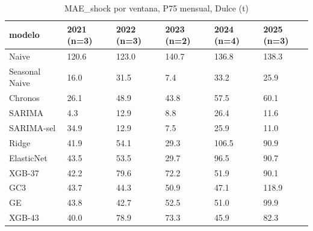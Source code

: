 \begin{table}[H]
\centering
\small
\caption{MAE\_shock por ventana, P75 mensual, Dulce (t)}
\label{tab:T05_MAE_shock_P75_por_ventana_dulce}
\begin{tabular}{llllll}
\toprule
modelo & 2021 (n=3) & 2022 (n=3) & 2023 (n=2) & 2024 (n=4) & 2025 (n=3) \\
\midrule
Naive & 120.6 & 123.0 & 140.7 & 136.8 & 138.3 \\
Seasonal Naive & 16.0 & 31.5 & 7.4 & 33.2 & 25.9 \\
Chronos & 26.1 & 48.9 & 43.8 & 57.5 & 60.1 \\
SARIMA & 4.3 & 12.9 & 8.8 & 26.4 & 11.6 \\
SARIMA-sel & 34.9 & 12.9 & 7.5 & 25.9 & 11.0 \\
Ridge & 41.9 & 54.1 & 29.3 & 106.5 & 90.9 \\
ElasticNet & 43.5 & 53.5 & 29.7 & 96.5 & 90.7 \\
XGB-37 & 42.2 & 79.6 & 72.2 & 51.9 & 90.1 \\
GC3 & 43.7 & 44.3 & 50.9 & 47.1 & 118.9 \\
GE & 43.8 & 42.7 & 52.5 & 51.0 & 99.9 \\
XGB-43 & 40.0 & 78.9 & 73.3 & 45.9 & 82.3 \\
\bottomrule
\end{tabular}
\end{table}